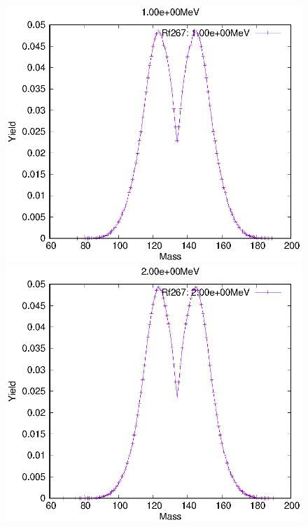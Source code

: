 \begin{figure}[htbp]
 \begin{minipage}{0.33\textwidth} \begin{center} \includegraphics[width=\textwidth]{YA/Rf267_1.00e+00.eps} \end{center} \end{minipage}
\begin{minipage}{0.33\textwidth} \begin{center} \includegraphics[width=\textwidth]{YA/Rf267_2.00e+00.eps} \end{center} \end{minipage}

\end{figure}
